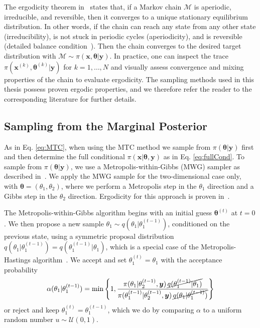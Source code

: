 The ergodicity theorem in~\cite{tan2016LecNot} states that, if a Markov chain $\mathcal{M}$ is aperiodic, irreducible, and reversible, then it converges to a unique stationary equilibrium distribution.
In other words, if the chain can reach any state from any other state (irreducibility), is not stuck in periodic cycles (aperiodicity), and is reversible (detailed balance condition~\cite{tan2016LecNot}).
Then the chain converges to the desired target distribution  with $ \mathcal{M} \sim \pi(\bm{x}, \bm{\theta} |  \bm{y})$.
In practice, one can inspect the trace $\pi(\bm{x}^{(k)}, \bm{\theta}^{(k)} |  \bm{y})$ for $k = 1, \dots, N$ and visually assess convergence and mixing properties of the chain to evaluate ergodicity.
The sampling methods used in this thesis possess proven ergodic properties, and we therefore refer the reader to the corresponding literature for further details.

\subsection{Sampling from the Marginal Posterior}
As in Eq. \ref{eq:MTC}, when using the MTC method we sample from $\pi(\bm{\theta} |  \bm{y})$ first and then determine the full conditional $\pi(\bm{x} | \bm{\theta} , \bm{y})$ as in Eq. \ref{eq:fullCond}. To sample from $\pi(\bm{\theta} |  \bm{y})$, we use a Metropolis-within-Gibbs (MWG) sampler as described in~\cite{fox2016fast}.
We apply the MWG sample for the two-dimensional case only, with $\bm{\theta} = (\theta_1, \theta_2)$, where we perform a Metropolis step in the $\theta_1$ direction and a Gibbs step in the $\theta_2$ direction.
Ergodicity for this approach is proven in~\cite{roberts2006harris}.


The Metropolis-within-Gibbs algorithm begins with an initial guess $\bm{\theta}^{(t)}$ at $t=0$. We then propose a new sample $\theta_1 \sim q(\theta_1 |  \theta_1^{(t-1)})$, conditioned on the previous state, using a symmetric proposal distribution $q(\theta_1 |  \theta_1^{(t-1)}) = q(\theta_1^{(t-1)} |  \theta_1)$, which is a special case of the Metropolis-Hastings algorithm~\cite{roberts2006harris}.
We accept and set $\theta_1^{(t)} = \theta_1$ with the acceptance probability
\begin{align}
	\alpha(\theta_1 |  \theta_1^{(t-1)}) = \min \left\{ 1, \frac{\pi(\theta_1 |  \theta_2^{(t-1)}, \bm{y}) \, \cancel{q(\theta_1^{(t-1)} |  \theta_1)}}{\pi(\theta_1^{(t-1)} |  \theta_2^{(t-1)}, \bm{y}) \, \cancel{q(\theta_1 |  \theta_1^{(t-1)})}} \right\}
\end{align}
or reject and keep $\theta_1^{(t)} = \theta_1^{(t-1)}$, which we do by comparing $\alpha$ to a uniform random number $u \sim \mathcal{U}(0,1)$. 

